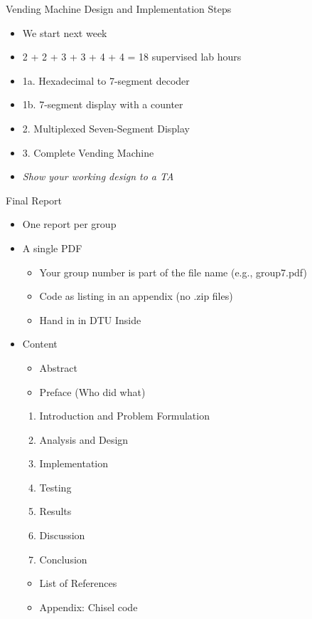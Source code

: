 \begin{frame}[fragile]{Vending Machine Design and Implementation Steps}
\begin{itemize}
\item We start next week
\item 2 + 2 + 3 + 3 + 4 + 4 = 18 supervised lab hours
\item 1a. Hexadecimal to 7-segment decoder
\item 1b. 7-segment display with a counter
\item 2. Multiplexed Seven-Segment Display
\item 3. Complete Vending Machine
\item \emph{Show your working design to a TA}
\end{itemize}
\end{frame}

\begin{frame}[fragile]{Final Report}
\begin{itemize}
\item One report per group
\item A single PDF
\begin{itemize}
\item Your group number is part of the file name (e.g., group7.pdf)
\item Code as listing in an appendix (no .zip files)
\item Hand in in DTU Inside
\end{itemize}
\item Content
\begin{itemize}
\item Abstract
\item Preface (Who did what)
\end{itemize}
\begin{enumerate}
\item Introduction and Problem Formulation
\item Analysis and Design
\item Implementation
\item Testing
\item Results
\item Discussion
\item Conclusion
\end{enumerate}
\begin{itemize}
\item List of References
\item Appendix: Chisel code
\end{itemize}
\end{itemize}
\end{frame}

